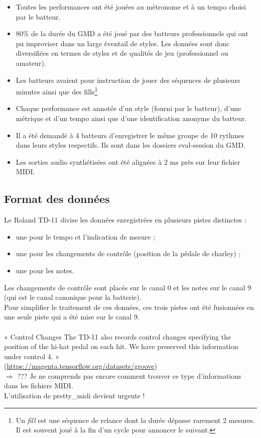 \begin{itemize}
	\item Toutes les performances ont été jouées au métronome et à un tempo choisi par le batteur.
	\item 80\% de la durée du GMD a été joué par des batteurs professionnels qui ont pu improviser dans un large éventail de styles. Les données sont donc diversifiées en termes de styles et de qualités de jeu (professionnel ou amateur).
	\item Les batteurs avaient pour instruction de jouer des séquences de plusieurs minutes ainsi que des fills\footnote{Un \textit{fill} est une séquence de relance dont la durée dépasse rarement 2 mesures. Il est souvent joué à la fin d’un cycle pour annoncer le suivant.}
	\item Chaque performance est annotée d’un style (fourni par le batteur), d’une métrique et d’un tempo ainsi que d’une identification anonyme du batteur.
	\item Il a été demandé à 4 batteurs d’enregistrer le même groupe de 10 rythmes dans leurs styles respectifs. Ils sont dans les dossiers eval-session du GMD.
	\item Les sorties audio synthétisées ont été alignées à 2 ms près sur leur fichier MIDI.
\end{itemize}
\subsection*{Format des données}
Le Roland TD-11 divise les données enregistrées en plusieurs pistes distinctes :
\begin{itemize}
	\item une pour le tempo et l’indication de mesure ;
	\item une pour les changements de contrôle (position de la pédale de charley) ;
	\item une pour les notes.\\
\end{itemize}
Les changements de contrôle sont placés sur le canal 0 et les notes sur le canal 9 (qui est le canal canonique pour la batterie).\\
Pour simplifier le traitement de ces données, ces trois pistes ont été fusionnées en une seule piste qui a été mise sur le canal 9.\\\\
« Control Changes
The TD-11 also records control changes specifying the position of the hi-hat pedal on each hit. We have preserved this information under control 4. »\\(\url{https://magenta.tensorflow.org/datasets/groove})\\$\Rightarrow$ ??? Je ne comprends pas encore comment trouver ce type d’informations dans les fichiers MIDI.\\L’utilisation de pretty\_midi devient urgente !
